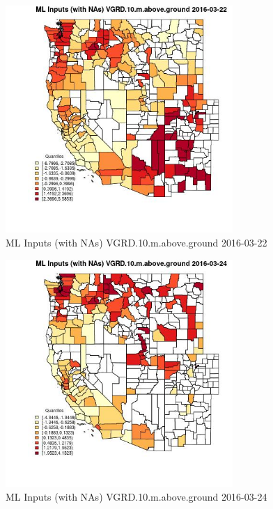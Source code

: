 \begin{figure} 
\centering  
\includegraphics[width=0.77\textwidth]{Code_Outputs/Report_ML_input_PM25_Step4_part_e_de_duplicated_aveswNAs_CountyVGRD10mabovegroundMean2016-03-22_2016-03-22.jpg} 
\caption{\label{fig:Report_ML_input_PM25_Step4_part_e_de_duplicated_aveswNAsCountyVGRD10mabovegroundMean2016-03-22_2016-03-22}ML Inputs (with NAs) VGRD.10.m.above.ground 2016-03-22} 
\end{figure} 
 

\begin{figure} 
\centering  
\includegraphics[width=0.77\textwidth]{Code_Outputs/Report_ML_input_PM25_Step4_part_e_de_duplicated_aveswNAs_CountyVGRD10mabovegroundMean2016-03-24_2016-03-24.jpg} 
\caption{\label{fig:Report_ML_input_PM25_Step4_part_e_de_duplicated_aveswNAsCountyVGRD10mabovegroundMean2016-03-24_2016-03-24}ML Inputs (with NAs) VGRD.10.m.above.ground 2016-03-24} 
\end{figure} 
 

